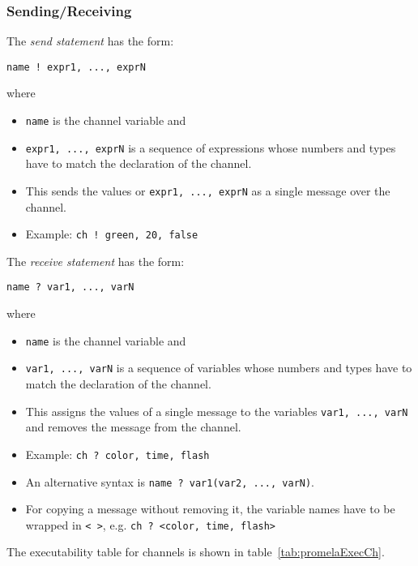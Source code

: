 \documentclass[a4paper, 11pt, accentcolor = tud3b]{tudreport}
\newcommand{\inlinePromela}[1]{\lstinline[language = PROMELA]|#1|}
\begin{document}
				\subsubsection{Sending/Receiving}
					The \textit{send statement} has the form:
					\begin{center}
						\inlinePromela{name ! expr1, ..., exprN}
					\end{center}
					where
					\begin{itemize}
						\item \inlinePromela{name} is the channel variable and
						\item \inlinePromela{expr1, ..., exprN} is a sequence of expressions whose numbers and types have to match the declaration of the channel.
						\item This sends the values or \inlinePromela{expr1, ..., exprN} as a single message over the channel.
						\item Example: \inlinePromela{ch ! green, 20, false}
					\end{itemize}
				
					The \textit{receive statement} has the form:
					\begin{center}
						\inlinePromela{name ? var1, ..., varN}
					\end{center}
					where
					\begin{itemize}
						\item \inlinePromela{name} is the channel variable and
						\item \inlinePromela{var1, ..., varN} is a sequence of variables whose numbers and types have to match the declaration of the channel.
						\item This assigns the values of a single message to the variables \inlinePromela{var1, ..., varN} and removes the message from the channel.
						\item Example: \inlinePromela{ch ? color, time, flash}
						\item An alternative syntax is \inlinePromela{name ? var1(var2, ..., varN)}.
						\item For copying a message without removing it, the variable names have to be wrapped in \inlinePromela{< >}, e.g. \inlinePromela{ch ? <color, time, flash>}
					\end{itemize}
				
					The executability table for channels is shown in table~\ref{tab:promelaExecCh}.
					
\end{document}
